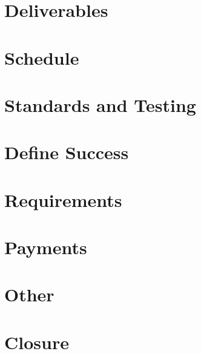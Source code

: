 \documentclass{article}
\begin{document}
  \section{ Deliverables}
  \section{ Schedule}
  \section{ Standards and Testing}
  \section{ Define Success}
  \section{ Requirements}
  \section{ Payments}
  \section{ Other}
  \section{ Closure}
\end{document}
